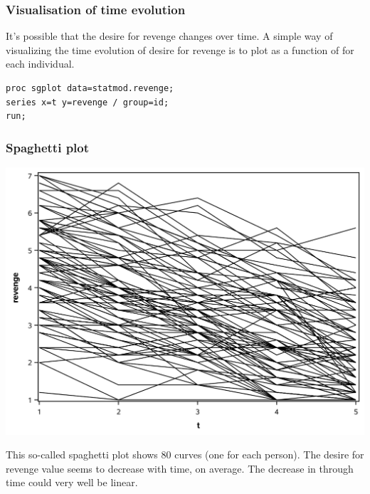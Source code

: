 \documentclass{beamer}
\begin{document}
\begin{frame}[fragile]
\frametitle{Visualisation of time evolution}
\bi
\item It's possible that the desire for revenge changes over time. A simple way of visualizing the time evolution of desire for revenge is to plot  as a function of  \alert{for each individual}.
 \ei 
\begin{tcolorbox}[colback=white, colframe=hecblue, title=\SASlang{} code to draw a spaghetti plot]
{\small
\begin{verbatim}
proc sgplot data=statmod.revenge;
series x=t y=revenge / group=id;
run;
\end{verbatim}
}
\end{tcolorbox}

\end{frame}




\begin{frame}[fragile]
\frametitle{Spaghetti plot}
\begin{center}
\includegraphics[width = 0.7\linewidth]{img/c5/slides6-e02}
\end{center}
This so-called spaghetti plot shows $80$ curves (one for each person). The desire for revenge value seems to decrease with time, on average.
% 
% 
The decrease in  through time could very well be linear. 

\end{frame}
\end{document}
